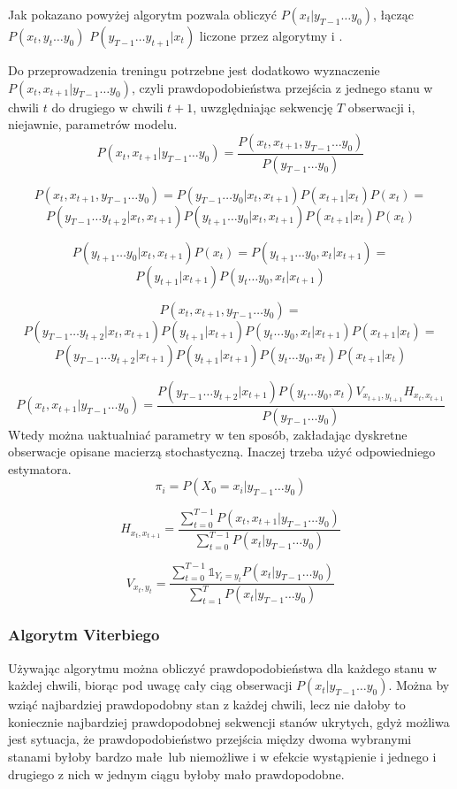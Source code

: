 Jak pokazano powyżej algorytm  pozwala obliczyć $P(x_t | y_{T-1} \dots y_0)$,
łącząc $P(x_t, y_t \dots y_0)$ $P(y_{T-1} \dots y_{t+1} | x_t)$ liczone przez algorytmy  i .

Do przeprowadzenia treningu  potrzebne jest dodatkowo wyznaczenie $P(x_t, x_{t+1} | y_{T-1} \dots y_0)$,
czyli prawdopodobieństwa przejścia z jednego stanu w chwili $t$ do drugiego w chwili $t + 1$,
uwzględniając sekwencję $T$ obserwacji i, niejawnie, parametrów modelu.
$$P(x_t, x_{t+1} | y_{T-1} \dots y_0)
= \frac{P(x_t, x_{t+1}, y_{T-1} \dots y_0)}{P(y_{T-1} \dots y_0)}$$

$$P(x_t, x_{t+1}, y_{T-1} \dots y_0) = P(y_{T-1} \dots y_0 | x_t, x_{t+1}) P(x_{t+1} | x_t) P(x_t) = $$
$$P(y_{T-1} \dots y_{t+2} | x_t, x_{t+1}) P(y_{t+1} \dots y_0 | x_t, x_{t+1}) P(x_{t+1} | x_t) P(x_t)$$

$$P(y_{t+1} \dots y_0 | x_t, x_{t+1}) P(x_t) = P(y_{t+1} \dots y_0, x_t | x_{t+1}) = $$
$$P(y_{t+1} | x_{t+1}) P(y_t \dots y_0, x_t | x_{t+1})$$

$$P(x_t, x_{t+1}, y_{T-1} \dots y_0) =$$
$$P(y_{T-1} \dots y_{t+2} | x_t, x_{t+1}) P(y_{t+1} | x_{t+1}) P(y_t \dots y_0, x_t | x_{t+1}) P(x_{t+1} | x_t) =$$
$$P(y_{T-1} \dots y_{t+2} | x_{t+1}) P(y_{t+1} | x_{t+1}) P(y_t \dots y_0, x_t) P(x_{t+1} | x_t)$$

$$P(x_t, x_{t+1} | y_{T-1} \dots y_0)
= \frac{P(y_{T-1} \dots y_{t+2} | x_{t+1}) P(y_t \dots y_0, x_t) V_{x_{t+1}, y_{t+1}} H_{x_t, x_{t+1}}}{P(y_{T-1} \dots y_0)}$$
Wtedy można uaktualniać parametry w ten sposób, zakładając dyskretne obserwacje opisane macierzą stochastyczną. Inaczej trzeba użyć odpowiedniego estymatora.
$$\pi_i = P(X_0 = x_i | y_{T-1} \dots y_0)$$

$$H_{x_t, x_{t+1}} = \frac{\sum_{t=0}^{T-1} P(x_t, x_{t+1} | y_{T-1} \dots y_0)}{\sum_{t=0}^{T-1} P(x_t | y_{T-1} \dots y_0)}$$

$$V_{x_t, y_t} = \frac{\sum_{t=0}^{T-1} \mathbb{1}_{Y_t = y_t} P(x_t | y_{T-1} \dots y_0)}{\sum_{t=1}^T P(x_t | y_{T-1} \dots y_0)}$$

\subsubsection{Algorytm Viterbiego}

Używając algorytmu  można obliczyć prawdopodobieństwa dla każdego stanu w każdej chwili, biorąc
pod uwagę cały ciąg obserwacji $P(x_t | y_{T-1} \dots y_0)$. Można by wziąć najbardziej prawdopodobny stan z każdej chwili,
lecz nie dałoby to koniecznie najbardziej prawdopodobnej sekwencji stanów ukrytych, gdyż możliwa jest sytuacja, że
prawdopodobieństwo przejścia między dwoma wybranymi stanami byłoby bardzo małe lub niemożliwe i w efekcie wystąpienie
i jednego i drugiego z nich w jednym ciągu byłoby mało prawdopodobne.

